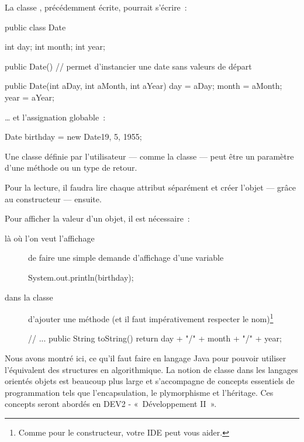 		La classe , précédemment écrite, pourrait s'écrire~:

		\begin{java}
public class Date{
	int day;
	int month;
	int year;

	public Date(){
		// permet d'instancier une date sans valeurs de départ
	}

	public Date(int aDay, int aMonth, int aYear){
		day = aDay;
		month = aMonth;
		year = aYear;
	}
}
		\end{java}


		… et l'assignation globable~:

		\begin{java}
Date birthday = new Date{19, 5, 1955};		
		\end{java}

		Une classe définie par l'utilisateur — comme la classe  — peut
		être un paramètre d'une méthode ou un type de retour. 

		Pour la lecture, il faudra lire chaque attribut séparément et créer
		l'objet — grâce au constructeur — ensuite. 

		Pour afficher la valeur d'un objet, il est nécessaire~:

		\begin{description}

			\item[là où l'on veut l'affichage] de faire une simple demande
				d'affichage d'une variable 

\begin{java}
System.out.println(birthday);
\end{java}

			\item[dans la classe] d'ajouter une méthode  (et
				il faut impérativement respecter le nom)\footnote{Comme pour le 
				constructeur, votre IDE peut vous aider.}

				\begin{java}
// ...
public String toString(){
	return day + "/" + month + "/" + year;
}
				\end{java}

		\end{description}

		Nous avons montré ici, ce qu'il faut faire en langage Java pour pouvoir
		utiliser l'équivalent des structures en algorithmique. La notion de
		classe dans les langages orientés objets est beaucoup plus large et
		s'accompagne de concepts essentiels de programmation tels que
		l'encapsulation, le plymorphisme et l'héritage. Ces concepts seront
		abordés en DEV2 - «~Développement II~».
	

